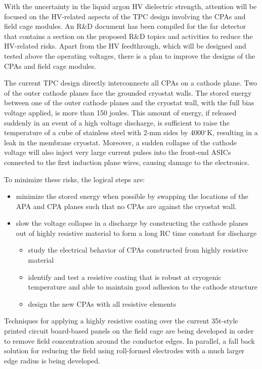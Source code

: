 With the uncertainty in the liquid argon HV dielectric strength, attention will be focused on the HV-related aspects of the TPC design involving the CPAs and field cage modules.  An R\&D document has been compiled for the far detector~\cite{fd_rndplan_10006} that contains a section on the proposed R\&D topics and activities to reduce the HV-related risks. Apart from the HV feedthrough, which will be designed and tested above the operating voltages, there is a plan to improve the designs of the CPAs and field cage modules.
 
The current TPC design directly interconnects all CPAs on a cathode plane. Two of the outer cathode planes face the grounded cryostat walls. The stored energy between one of the outer cathode planes and the cryostat wall, with the full bias voltage applied, is more than 150 joules\cite{ve-fd_025_8920}. This amount of energy, if released suddenly in an event of a high voltage discharge, is sufficient to raise the temperature of a cube of stainless steel with 2-mm sides by 4000$^\circ$K, resulting in a leak in the membrane cryostat. Moreover, a sudden collapse of the cathode voltage will also inject very large current pulses into the front-end ASICs connected to the first induction plane wires, causing damage to the electronics.
 
To minimize these risks, the logical steps are:
\begin{itemize}
\item minimize the stored energy when possible by swapping the locations of the APA and CPA planes such that no CPAs are against the cryostat wall.
\item slow the voltage collapse in a discharge by constructing the cathode planes out of highly resistive material to form a long RC time constant for discharge
\begin{itemize}
\item study the electrical behavior of CPAs constructed from highly resistive material
\item identify and test a resistive coating that is robust at cryogenic temperature and able to maintain good adhesion to the cathode structure
\item design the new CPAs with all resistive elements
\end{itemize}
\end{itemize}
 
Techniques for applying a highly resistive coating over the current 35t-style printed circuit board-based panels on the field cage are being developed in order to remove field concentration around the conductor edges.
In parallel, a fall back solution for reducing the field using roll-formed electrodes with a much larger edge radius is being developed.
 
